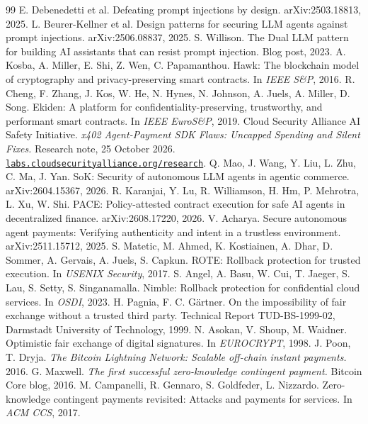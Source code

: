\documentclass[10pt,a4paper,twocolumn]{article}
\begin{document}
{\begin{thebibliography}{99}
 E. Debenedetti et al. Defeating prompt injections by design. arXiv:2503.18813, 2025.
 L. Beurer-Kellner et al. Design patterns for securing LLM agents against prompt injections. arXiv:2506.08837, 2025.
 S. Willison. The Dual LLM pattern for building AI assistants that can resist prompt injection. Blog post, 2023.
 A. Kosba, A. Miller, E. Shi, Z. Wen, C. Papamanthou. Hawk: The blockchain model of cryptography and privacy-preserving smart contracts. In \emph{IEEE S\&P}, 2016.
 R. Cheng, F. Zhang, J. Kos, W. He, N. Hynes, N. Johnson, A. Juels, A. Miller, D. Song. Ekiden: A platform for confidentiality-preserving, trustworthy, and performant smart contracts. In \emph{IEEE EuroS\&P}, 2019.
 Cloud Security Alliance AI Safety Initiative. \emph{x402 Agent-Payment SDK Flaws: Uncapped Spending and Silent Fixes.} Research note, 25 October 2026. \href{https://labs.cloudsecurityalliance.org/research/csa-research-note-x402-agent-payment-sdk-flaws-20261025-csa/}{\texttt{labs.cloudsecurityalliance.org/research}}.
 Q. Mao, J. Wang, Y. Liu, L. Zhu, C. Ma, J. Yan. SoK: Security of autonomous LLM agents in agentic commerce. arXiv:2604.15367, 2026.
 R. Karanjai, Y. Lu, R. Williamson, H. Hm, P. Mehrotra, L. Xu, W. Shi. PACE: Policy-attested contract execution for safe AI agents in decentralized finance. arXiv:2608.17220, 2026.
 V. Acharya. Secure autonomous agent payments: Verifying authenticity and intent in a trustless environment. arXiv:2511.15712, 2025.
 S. Matetic, M. Ahmed, K. Kostiainen, A. Dhar, D. Sommer, A. Gervais, A. Juels, S. Capkun. ROTE: Rollback protection for trusted execution. In \emph{USENIX Security}, 2017.
 S. Angel, A. Basu, W. Cui, T. Jaeger, S. Lau, S. Setty, S. Singanamalla. Nimble: Rollback protection for confidential cloud services. In \emph{OSDI}, 2023.
 H. Pagnia, F. C. G\"artner. On the impossibility of fair exchange without a trusted third party. Technical Report TUD-BS-1999-02, Darmstadt University of Technology, 1999.
 N. Asokan, V. Shoup, M. Waidner. Optimistic fair exchange of digital signatures. In \emph{EUROCRYPT}, 1998.
 J. Poon, T. Dryja. \emph{The Bitcoin Lightning Network: Scalable off-chain instant payments.} 2016.
 G. Maxwell. \emph{The first successful zero-knowledge contingent payment.} Bitcoin Core blog, 2016.
 M. Campanelli, R. Gennaro, S. Goldfeder, L. Nizzardo. Zero-knowledge contingent payments revisited: Attacks and payments for services. In \emph{ACM CCS}, 2017.

\end{thebibliography}}
\end{document}

